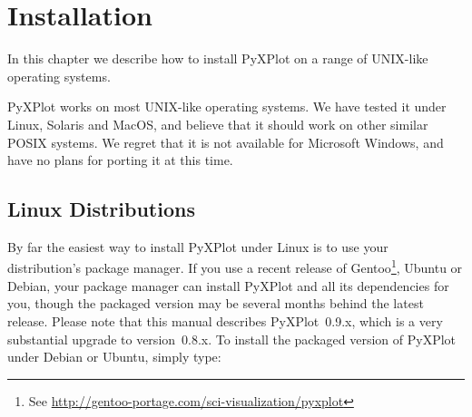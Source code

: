 %
%
%
%
%



\chapter{Installation}

\label{ch:installation}

In this chapter we describe how to install PyXPlot on a range of UNIX-like
operating systems.

PyXPlot works on most UNIX-like operating systems. We have tested it under
Linux, Solaris and MacOS, and believe that it
should work on other similar POSIX systems. We regret that it is not available
for Microsoft Windows, and have no plans for porting it at this time.

\section{Linux Distributions}

By far the easiest way to install PyXPlot under Linux is to use your
distribution's package manager.  If you use a recent release of
Gentoo\footnote{See
\url{http://gentoo-portage.com/sci-visualization/pyxplot}}, Ubuntu or Debian, your package manager can
install PyXPlot and all its dependencies for you, though the packaged version
may be several months behind the latest release. Please note that this manual
describes PyXPlot~0.9.x, which is a very substantial upgrade to version~0.8.x.
To install the packaged version of PyXPlot under Debian or Ubuntu, simply type:

